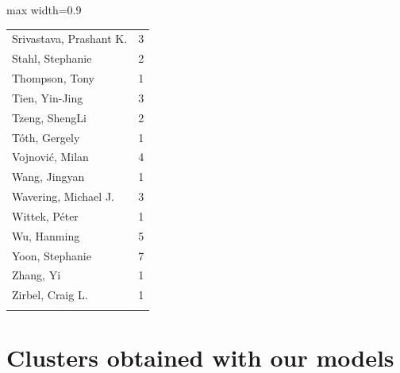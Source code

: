 \documentclass[a4paper,11pt, reqno]{amsart}
\begin{document}
{\begin{adjustbox}{max width=0.9\textwidth}
\begin{tabular}{l l}
Srivastava, Prashant K. & 3 \\
Stahl, Stephanie & 2 \\
Thompson, Tony & 1 \\
Tien, Yin-Jing & 3 \\
Tzeng, ShengLi & 2 \\
Tóth, Gergely & 1 \\
Vojnović, Milan & 4 \\
Wang, Jingyan & 1 \\
Wavering, Michael J. & 3 \\
Wittek, Péter & 1 \\
Wu, Hanming & 5 \\
Yoon, Stephanie & 7 \\
Zhang, Yi & 1 \\
Zirbel, Craig L. & 1 \\
&\\
\end{tabular}\end{adjustbox}

\section*{Clusters obtained with our models}

}
\end{document}
